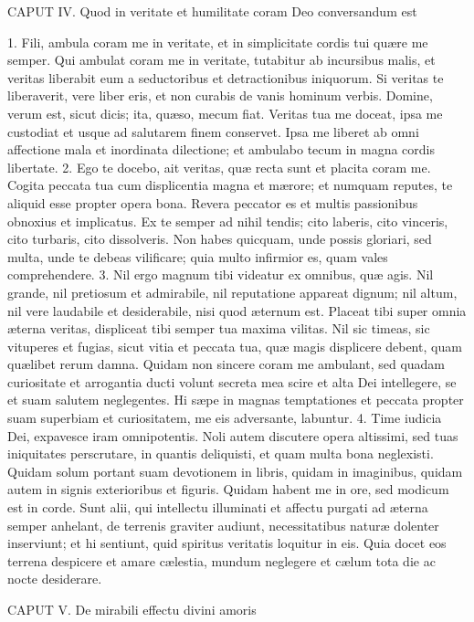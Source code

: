 \documentclass[twoside]{article}
\begin{document}
CAPUT IV.
Quod in veritate et humilitate coram Deo conversandum est

1. Fili, ambula coram me in veritate, et in simplicitate cordis tui quære me semper. Qui ambulat coram me in veritate, tutabitur ab incursibus malis, et veritas liberabit eum a seductoribus et detractionibus iniquorum. Si veritas te liberaverit, vere liber eris, et non curabis de vanis hominum verbis.
Domine, verum est, sicut dicis; ita, quæso, mecum fiat. Veritas tua me doceat, ipsa me custodiat et usque ad salutarem finem conservet. Ipsa me liberet ab omni affectione mala et inordinata dilectione; et ambulabo tecum in magna cordis libertate.
2. Ego te docebo, ait veritas, quæ recta sunt et placita coram me. Cogita peccata tua cum displicentia magna et mærore; et numquam reputes, te aliquid esse propter opera bona. Revera peccator es et multis passionibus obnoxius et implicatus. Ex te semper ad nihil tendis; cito laberis, cito vinceris, cito turbaris, cito dissolveris. Non habes quicquam, unde possis gloriari, sed multa, unde te debeas vilificare; quia multo infirmior es, quam vales comprehendere.
3. Nil ergo magnum tibi videatur ex omnibus, quæ agis. Nil grande, nil pretiosum et admirabile, nil reputatione appareat dignum; nil altum, nil vere laudabile et desiderabile, nisi quod æternum est. Placeat tibi super omnia æterna veritas, displiceat tibi semper tua maxima vilitas. Nil sic timeas, sic vituperes et fugias, sicut vitia et peccata tua, quæ magis displicere debent, quam quælibet rerum damna. Quidam non sincere coram me ambulant, sed quadam curiositate et arrogantia ducti volunt secreta mea scire et alta Dei intellegere, se et suam salutem neglegentes. Hi sæpe in magnas temptationes et peccata propter suam superbiam et curiositatem, me eis adversante, labuntur.
4. Time iudicia Dei, expavesce iram omnipotentis. Noli autem discutere opera altissimi, sed tuas iniquitates perscrutare, in quantis deliquisti, et quam multa bona neglexisti. Quidam solum portant suam devotionem in libris, quidam in imaginibus, quidam autem in signis exterioribus et figuris. Quidam habent me in ore, sed modicum est in corde. Sunt alii, qui intellectu illuminati et affectu purgati ad æterna semper anhelant, de terrenis graviter audiunt, necessitatibus naturæ dolenter inserviunt; et hi sentiunt, quid spiritus veritatis loquitur in eis. Quia docet eos terrena despicere et amare cælestia, mundum neglegere et cælum tota die ac nocte desiderare.


CAPUT V.
De mirabili effectu divini amoris
\end{document}
